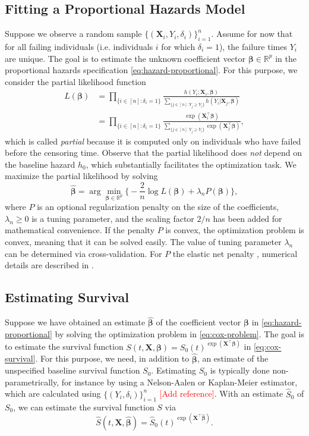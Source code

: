 \documentclass[11pt]{article}
\newcommand{\R}{\mathbb{R}}
\newcommand{\X}{\mathbf{X}}
\renewcommand{\b}{\bm{\beta}}
\begin{document}
\subsection{Fitting a Proportional Hazards Model}
Suppose we observe a random sample  $\big\{ (\X_i, Y_i, \delta_i) \big\}_{i=1}^n$. Assume for now that for all failing individuals (i.e. individuals $i$ for which $\delta_i = 1$), the failure times $Y_i$ are unique. The goal is to estimate the unknown coefficient vector $\b\in\R^p$ in the proportional hazards specification \eqref{eq:hazard-proportional}. For this purpose, we consider the partial likelihood function
\begin{equation} \label{eq:cox-likelihood}
    \begin{split}
        L(\b)
        &=
        \prod_{\{ i \in [n] : \delta_i = 1 \}}
        \frac{ h(Y_i ; \X_i, \b) }{ \sum_{\{ j\in[n] : Y_j \geq Y_i \}} h(Y_i | \X_j, \b) }
        \\
        &=
        \prod_{\{ i \in [n] : \delta_i = 1 \}}
        \frac{ \exp(\X_i^\top \b) }{ \sum_{\{ j\in[n] : Y_j \geq Y_i \}} \exp(\X_j^\top \b) },
    \end{split}
\end{equation}
which is called \textit{partial} because it is computed only on individuals who have failed before the censoring time. Observe that the partial likelihood does \textit{not} depend on the baseline hazard $h_0$, which substantially facilitates the optimization task. We maximize the partial likelihood by solving
\begin{equation} \label{eq:cox-problem}
	\widehat{\b} = \arg\min_{\b\in\R^p} 
	\bigg\{ 
		-\frac{2}{n} \log L(\b) + \lambda_n P(\b)
	\bigg\},
\end{equation}
where $P$ is an optional regularization penalty on the size of the coefficients, $\lambda_n\geq 0$ is a tuning parameter, and the scaling factor $2/n$ has been added for mathematical convenience. If the penalty $P$ is convex, the optimization problem is convex, meaning that it can be solved easily. The value of tuning parameter $\lambda_n$ can be determined via cross-validation. For $P$ the elastic net penalty \citep{zou2005}, numerical details are described in \cite{simon2011}.

\subsection{Estimating Survival}
Suppose we have obtained an estimate $\widehat{\b}$ of the coefficient vector $\b$ in \eqref{eq:hazard-proportional} by solving the optimization problem in \eqref{eq:cox-problem}. The goal is to estimate the survival function $S(t, \X, \b) = S_0(t)^{\exp(\X^\top \b)}$ in \eqref{eq:cox-survival}. For this purpose, we need, in addition to $\widehat{\b}$, an estimate of the unspecified baseline survival function $S_0$. Estimating $S_0$ is typically done non-parametrically, for instance by using a Nelson-Aalen or Kaplan-Meier estimator, which are calculated using $\{( Y_i, \delta_i )\}_{i=1}^n$ \textcolor{red}{[Add reference]}. With an estimate $\widehat{S}_0$ of $S_0$, we can estimate the survival function $S$ via 
\[
	\widehat{S}(t, \X, \widehat{\b}) = \widehat{S}_0(t)^{\exp(\X^\top \widehat{\b})}.
\]
\end{document}
